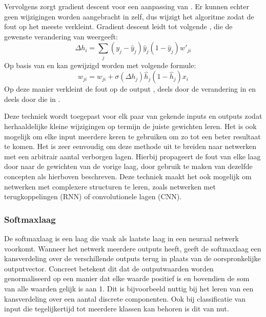 Vervolgens zorgt gradient descent voor een aanpassing van . Er kunnen echter geen wijzigingen worden aangebracht in  zelf, dus wijzigt het algoritme  zodat de fout op  het meeste verkleint. Gradient descent leidt tot volgende , die de gewenste verandering van  weergeeft:
\begin{equation}
    \Delta h_i = \sum\limits_{j}(y_j-\hat{y}_j)\hat{y}_j(1-\hat{y}_j)w'_{ji}
\end{equation}
Op basis van  en  kan  gewijzigd worden met volgende formule:
\begin{equation}
    w_{ji} = w_{ji} + \sigma(\Delta h_j)\hat{h}_j(1-\hat{h}_j)x_i
\end{equation}
Op deze manier verkleint de fout op de output , deels door de verandering in  en deels door die in . \cite{Blockeel}

Deze techniek wordt toegepast voor elk paar van gekende inputs en outputs zodat herhaaldelijke kleine wijzigingen op termijn de juiste gewichten leren. Het is ook mogelijk om elke input meerdere keren te gebruiken om zo tot een beter resultaat te komen. Het is zeer eenvoudig om deze methode uit te breiden naar netwerken met een arbitrair aantal verborgen lagen. Hierbij propageert de fout van elke laag door naar de gewichten van de vorige laag, door gebruik te maken van dezelfde concepten als hierboven beschreven. Deze techniek maakt het ook mogelijk om netwerken met complexere structuren te leren, zoals netwerken met terugkoppelingen (RNN) of convolutionele lagen (CNN).

\subsubsection{Softmaxlaag}\label{par:softmax}
De softmaxlaag is een laag die vaak als laatste laag in een neuraal netwerk voorkomt. Wanneer het netwerk meerdere outputs heeft, geeft de softmaxlaag een kansverdeling over de verschillende outputs terug in plaats van de oorspronkelijke outputvector. Concreet betekent dit dat de outputwaarden worden genormaliseerd op een manier dat elke waarde positief is en bovendien de som van alle waarden gelijk is aan 1. Dit is bijvoorbeeld nuttig bij het leren van een kansverdeling over een aantal discrete componenten. Ook bij classificatie van input die tegelijkertijd tot meerdere klassen kan behoren is dit van nut.

